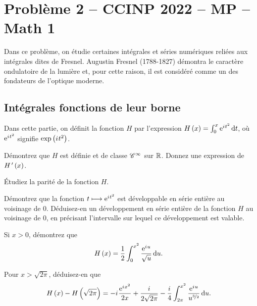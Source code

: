 \section*{Problème 2 -- CCINP 2022 -- MP -- Math 1}

Dans ce problème, on étudie certaines intégrales et séries numériques reliées aux intégrales dites de Fresnel. Augustin Fresnel (1788-1827) démontra le caractère ondulatoire de la lumière et, pour cette raison, il est considéré comme un des fondateurs de l'optique moderne.

\subsection*{Intégrales fonctions de leur borne}


Dans cette partie, on définit la fonction \(H\) par l'expression \(H\paren{x}=\int_0^x\e{\i t^2}\odif{t}\), où \(\mathrm{e}^{i\mkern1mu t^2}\) signifie \(\exp\left(i\mkern1mu t^2\right)\).

\setcounter{q}{0}
\begin{q}
Démontrez que \(H\) est définie et de classe \(\mathscr{C}^{\infty}\) sur \(\mathbb{R}\). Donnez une expression de \(H^{\,\prime}\left(x\right)\).
\end{q}

\begin{q}
Étudiez la parité de la fonction \(H\).
\end{q}

\begin{q}
Démontrez que la fonction \(t\longmapsto\mathrm{e}^{i\mkern1mu t^2}\) est développable en série entière au voisinage de \(0\). Déduisez-en un développement en série entière de la fonction \(H\) au voisinage de \(0\), en précisant l'intervalle sur lequel ce développement est valable.
\end{q}

\begin{q}
Si \(x>0\), démontrez que \[H\paren{x}=\dfrac{1}{2}\int_0^{x^2}\dfrac{\e{\i u}}{\sqrt{u}}\odif{u}.\]
\end{q}

\begin{q}
Pour \(x>\sqrt{2\pi}\), déduisez-en que \[H\paren{x}-H\paren{\sqrt{2\pi}}=-\i\dfrac{\e{\i x^2}}{2x}+\dfrac{\i}{2\sqrt{2\pi}}-\dfrac{\i}{4}\int_{2\pi}^{x^2}\dfrac{\e{\i u}}{u^{\nicefrac{3}{2}}}\odif{u}.\]
\end{q}

